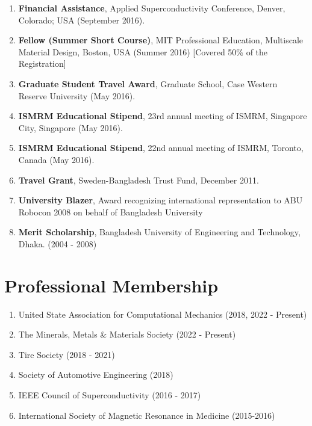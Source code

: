 \documentclass[11pt, letterpaper]{article}
\begin{document}
\begin{enumerate}[label=\arabic*., itemsep=-1pt, topsep=2pt]
        \item \textbf{Financial Assistance}, Applied Superconductivity Conference, Denver, Colorado; USA (September 2016).
        \item \textbf{Fellow (Summer Short Course)}, MIT Professional Education, Multiscale Material Design, Boston, USA (Summer 2016) [Covered 50\% of the Registration]
        \item \textbf{Graduate Student Travel Award}, Graduate School, Case Western Reserve University (May 2016).
        \item \textbf{ISMRM Educational Stipend}, 23rd annual meeting of ISMRM, Singapore City, Singapore (May 2016).
        \item \textbf{ISMRM Educational Stipend}, 22nd annual meeting of ISMRM, Toronto, Canada (May 2016).
        \item \textbf{Travel Grant}, Sweden-Bangladesh Trust Fund, December 2011.
        \item \textbf{University Blazer}, Award recognizing international representation to ABU Robocon 2008 on behalf of Bangladesh University
        \item \textbf{Merit Scholarship}, Bangladesh University
of Engineering and Technology, Dhaka. (2004 - 2008)
    \end{enumerate}

\section{Professional Membership}
    \begin{enumerate}[label=\arabic*., itemsep=-1pt, topsep=2pt]
        \item United State Association for Computational Mechanics (2018, 2022 - Present)
        \item The Minerals, Metals \& Materials Society (2022 - Present)
        \item Tire Society (2018 - 2021)
        \item Society of Automotive Engineering (2018)
        \item IEEE Council of Superconductivity (2016 - 2017)
        \item International Society of Magnetic Resonance in Medicine (2015-2016)
    \end{enumerate}
    
\end{document}
